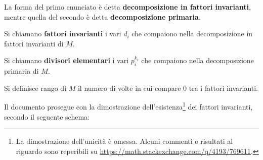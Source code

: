 \documentclass[12pt]{scrartcl}
\begin{document}
	La forma del primo enunciato è detta \textbf{decomposizione in fattori invarianti},
	mentre quella del secondo è detta \textbf{decomposizione primaria}.

	\begin{definition}
		Si chiamano \textbf{fattori invarianti} i vari $d_i$ che compaiono
		nella decomposizione in fattori invarianti di $M$.
	\end{definition}

	\begin{definition}
		Si chiamano \textbf{divisori elementari} i vari $p_i^{k_i}$ che
		compaiono nella decomposizione primaria di $M$.
	\end{definition}

	\begin{definition}
		Si definisce rango di $M$ il numero di volte in cui compare $0$
		tra i fattori invarianti.
	\end{definition}
	
	Il documento prosegue con la dimostrazione dell'esistenza\footnote{
		La dimostrazione dell'unicità è omessa. Alcuni commenti e risultati al
		riguardo sono reperibili su \url{https://math.stackexchange.com/q/4193/769611}.
	} dei fattori
	invarianti, secondo il seguente schema:
	
\end{document}
